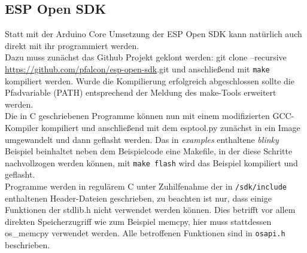 \subsection{ESP Open SDK}
Statt mit der Arduino Core Umsetzung der ESP Open SDK kann natürlich auch direkt mit ihr programmiert werden. \\
Dazu muss zunächst das Github Projekt geklont werden: git clone --recursive \url{https://github.com/pfalcon/esp-open-sdk}.git und anschließend mit \texttt{make} kompiliert werden.
Wurde die Kompilierung erfolgreich abgeschlossen sollte die Pfadvariable (PATH) entsprechend der Meldung des make-Tools erweitert werden. \\
Die in C geschriebenen Programme können nun mit einem modifizierten GCC-Kompiler kompiliert und anschließend mit dem esptool.py zunächst in ein Image umgewandelt und dann geflasht werden. 
Das in \textit{examples} enthaltene \textit{blinky} Beispiel beinhaltet neben dem Beispielcode eine Makefile, in der diese Schritte nachvollzogen werden können, mit \texttt{make flash} wird das Beispiel kompiliert und geflasht. \\
Programme werden in regulärem C unter Zuhilfenahme der in \texttt{/sdk/include} enthaltenen Header-Dateien geschrieben, zu beachten ist nur, dass einige Funktionen der stdlib.h nicht verwendet werden können.
Dies betrifft vor allem direkten Speicherzugriff wie zum Beispiel memcpy, hier muss stattdessen os\_memcpy verwendet werden.
Alle betroffenen Funktionen sind in \texttt{osapi.h} beschrieben.


